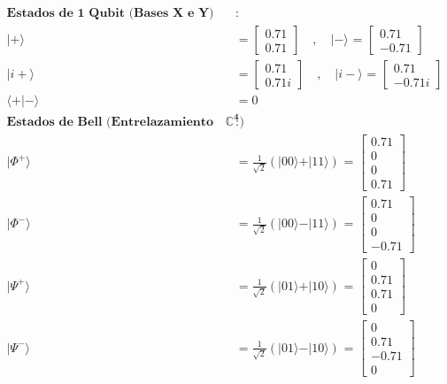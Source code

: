 \documentclass[11pt]{article}
\begin{document}
    $\displaystyle 
\begin{aligned}
\mathbf{\text{Estados de 1 Qubit (Bases X e Y)}} &: \\[0.3em]
\vert{+}\rangle &= \begin{bmatrix} 0.71 \\ 0.71 \end{bmatrix} \quad, \quad \vert{-}\rangle \text{ = } \begin{bmatrix} 0.71 \\ -0.71 \end{bmatrix} \\[0.5em]
\vert{i+}\rangle &= \begin{bmatrix} 0.71 \\ 0.71i \end{bmatrix} \quad, \quad \vert{i-}\rangle \text { = } \begin{bmatrix} 0.71 \\ -0.71i \end{bmatrix} \\[0.5em]
\langle + \vert{-}\rangle &= 0 \\[1.5em]
\mathbf{\text{Estados de Bell (Entrelazamiento en } \mathbb{C}^4\mathbf{)}} &:\\[0.3em]
\vert{\Phi^+}\rangle &= \frac{1}{\sqrt{2}}(\vert{00}\rangle + \vert{11}\rangle) \text{ = } \begin{bmatrix} 0.71 \\ 0 \\ 0 \\ 0.71 \end{bmatrix} \\[0.5em]
\vert{\Phi^-}\rangle &= \frac{1}{\sqrt{2}}(\vert{00}\rangle - \vert{11}\rangle) \text{ = } \begin{bmatrix} 0.71 \\ 0 \\ 0 \\ -0.71 \end{bmatrix} \\[0.5em]
\vert{\Psi^+}\rangle &= \frac{1}{\sqrt{2}}(\vert{01}\rangle + \vert{10}\rangle) \text{ = } \begin{bmatrix} 0 \\ 0.71 \\ 0.71 \\ 0 \end{bmatrix} \\[0.5em]
\vert{\Psi^-}\rangle &= \frac{1}{\sqrt{2}}(\vert{01}\rangle - \vert{10}\rangle) \text{ = } \begin{bmatrix} 0 \\ 0.71 \\ -0.71 \\ 0 \end{bmatrix}
\end{aligned}
$
\end{document}
